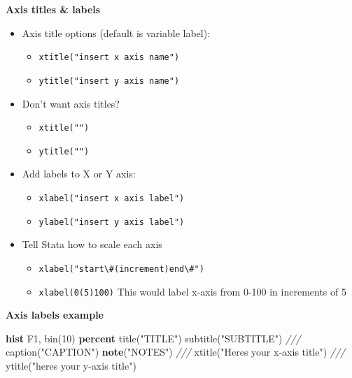 \documentclass[
]{book}
\newenvironment{Shaded}{\begin{snugshade}}{\end{snugshade}}
\newcommand{\BaseNTok}[1]{\textcolor[rgb]{0.00,0.00,0.81}{#1}}
\newcommand{\CommentTok}[1]{\textcolor[rgb]{0.56,0.35,0.01}{\textit{#1}}}
\newcommand{\KeywordTok}[1]{\textcolor[rgb]{0.13,0.29,0.53}{\textbf{#1}}}
\newcommand{\NormalTok}[1]{#1}
\newcommand{\StringTok}[1]{\textcolor[rgb]{0.31,0.60,0.02}{#1}}
\providecommand{\tightlist}{%
  \setlength{\itemsep}{0pt}\setlength{\parskip}{0pt}}
\begin{document}
\textbf{Axis titles \& labels}

\begin{itemize}
\tightlist
\item
  Axis title options (default is variable label):

  \begin{itemize}
  \tightlist
  \item
    \texttt{xtitle("insert\ x\ axis\ name")}
  \item
    \texttt{ytitle("insert\ y\ axis\ name")}
  \end{itemize}
\item
  Don't want axis titles?

  \begin{itemize}
  \tightlist
  \item
    \texttt{xtitle("")}
  \item
    \texttt{ytitle("")}
  \end{itemize}
\item
  Add labels to X or Y axis:

  \begin{itemize}
  \tightlist
  \item
    \texttt{xlabel("insert\ x\ axis\ label")}
  \item
    \texttt{ylabel("insert\ y\ axis\ label")}
  \end{itemize}
\item
  Tell Stata how to scale each axis

  \begin{itemize}
  \tightlist
  \item
    \texttt{xlabel("start\textbackslash{}\#(increment)end\textbackslash{}\#")}
  \item
    \texttt{xlabel(0(5)100)} This would label x-axis from 0-100 in increments of 5
  \end{itemize}
\end{itemize}

\textbf{Axis labels example}

\begin{Shaded}
\begin{Highlighting}[]
\KeywordTok{hist}\NormalTok{ F1, }\BaseNTok{bin}\NormalTok{(10) }\KeywordTok{percent} \BaseNTok{title}\NormalTok{(}\StringTok{"TITLE"}\NormalTok{) }\BaseNTok{subtitle}\NormalTok{(}\StringTok{"SUBTITLE"}\NormalTok{) }\CommentTok{///}
    \BaseNTok{caption}\NormalTok{(}\StringTok{"CAPTION"}\NormalTok{) }\KeywordTok{note}\NormalTok{(}\StringTok{"NOTES"}\NormalTok{) }\CommentTok{///}
    \BaseNTok{xtitle}\NormalTok{(}\StringTok{"Here\textquotesingle{}s your x{-}axis title"}\NormalTok{) }\CommentTok{///}
    \BaseNTok{ytitle}\NormalTok{(}\StringTok{"here\textquotesingle{}s your y{-}axis title"}\NormalTok{)}
\end{Highlighting}
\end{Shaded}
\end{document}
